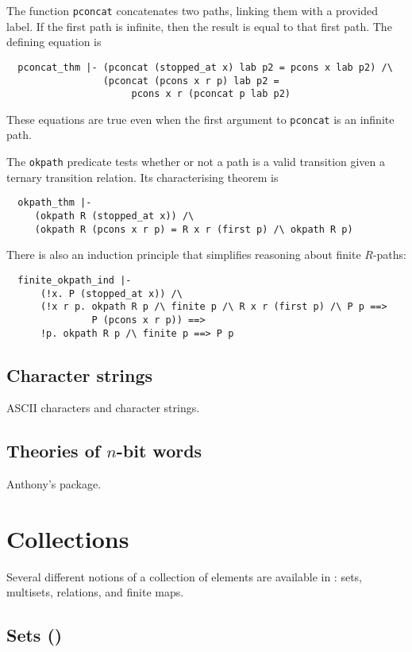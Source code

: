 The function \texttt{pconcat} concatenates two paths, linking them
with a provided label.  If the first path is infinite, then the result
is equal to that first path.  The defining equation is
{\small
\begin{verbatim}
  pconcat_thm |- (pconcat (stopped_at x) lab p2 = pcons x lab p2) /\
                 (pconcat (pcons x r p) lab p2 =
                      pcons x r (pconcat p lab p2)
\end{verbatim}
}
\noindent
These equations are true even when the first argument to
\texttt{pconcat} is an infinite path.

The \texttt{okpath} predicate tests whether or not a path is a valid
transition given a ternary transition relation.  Its characterising
theorem is
{\small
\begin{verbatim}
  okpath_thm |-
     (okpath R (stopped_at x)) /\
     (okpath R (pcons x r p) = R x r (first p) /\ okpath R p)
\end{verbatim}
}

There is also an induction principle that simplifies reasoning about
finite $R$-paths:
{\small
\begin{verbatim}
  finite_okpath_ind |-
      (!x. P (stopped_at x)) /\
      (!x r p. okpath R p /\ finite p /\ R x r (first p) /\ P p ==>
               P (pcons x r p)) ==>
      !p. okpath R p /\ finite p ==> P p
\end{verbatim}
}


\subsection{Character strings}

ASCII characters and character strings.

\subsection{Theories of $n$-bit words}

Anthony's package.

\section{Collections}

Several different notions of a collection of elements are available in
\HOL: sets, multisets, relations, and finite maps.

\subsection{Sets (\theoryimp{pred\_set})}

